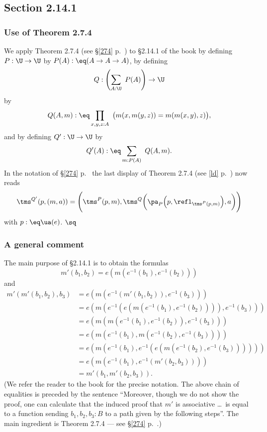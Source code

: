 \documentclass[12pt]{article}
\begin{document}
\subsection{Section 2.14.1}

\subsubsection{Use of Theorem 2.7.4}


We apply Theorem 2.7.4 (see \S\ref{274} p.~\pageref{274}) to \S2.14.1 of the book by defining $P:\U\to\U$ by $P(A):\eq(A\to A\to A)$, by defining 
$$
Q:\left(\sum_{A:\U}\ P(A)\right)\to\U
$$ 
by 
$$
Q(A,m):\eq\prod_{x,y,z:A}\ \big(m(x,m(y,z))=m(m(x,y),z)\big),
$$ 
and by defining $Q':\U\to\U$ by 
$$ 
Q'(A):\eq\sum_{m:P(A)}\ Q(A,m).
$$  
In the notation of \S\ref{274} p.~\pageref{274} the last display of Theorem 2.7.4 (see \eqref{ld} p.~\pageref{ld}) now reads 
$$
\tms^{Q'}(p,(m,a))=\Bigg(\tms^P(p,m),\tms^Q\bigg(\pa_P\Big(p,\refl_{\tms^P(p,m)}\Big),a\bigg)\Bigg)
$$ 
with $p:\eq\ua(e)$. $\sq$

\subsubsection{A general comment}

The main purpose of \S2.14.1 is to obtain the formulas
$$
m'(b_1,b_2)=e(m(e^{-1}(b_1),e^{-1}(b_2)))
$$ 
and
\begin{equation*}
  \begin{aligned}
    m'(m'(b_1,b_2),b_3)
    &= e(m(e^{-1}(m'(b_1,b_2)),e^{-1}(b_3))) \\
    &= e(m(e^{-1}(e(m(e^{-1}(b_1),e^{-1}(b_2)))),e^{-1}(b_3))) \\
    &= e(m(m(e^{-1}(b_1),e^{-1}(b_2)),e^{-1}(b_3))) \\
    &= e(m(e^{-1}(b_1),m(e^{-1}(b_2),e^{-1}(b_3)))) \\
    &= e(m(e^{-1}(b_1),e^{-1}(e(m(e^{-1}(b_2),e^{-1}(b_3)))))) \\
    &= e(m(e^{-1}(b_1),e^{-1}(m'(b_2,b_3)))) \\
    &= m'(b_1,m'(b_2,b_3)).
\end{aligned}
\end{equation*}
(We refer the reader to the book for the precise notation. The above chain of equalities is preceded by the sentence ``Moreover, though we do not show the proof, one can calculate that the induced proof that $m'$ is associative \dots\ is equal to a function sending $b_1,b_2,b_3:B$ to a path given by the following steps''. The main ingredient is Theorem 2.7.4 --- see \S\ref{274} p.~\pageref{274}.)
\end{document}
